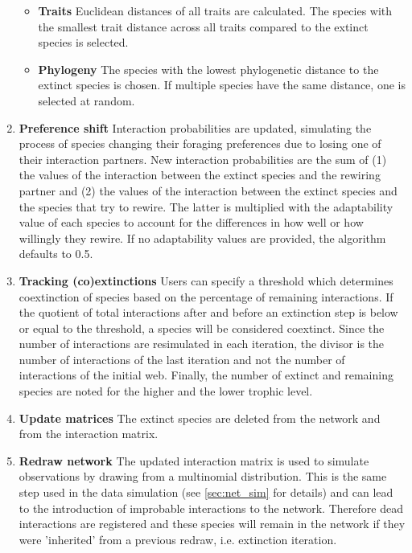 \documentclass[12pt,a4paper]{article}
\begin{document}
\begin{enumerate}
\begin{itemize}
		\item \label{itm:trait_rew} \textbf{Traits} {\small Euclidean distances of all traits are calculated. The species with the smallest trait distance across all traits compared to the extinct species is selected.}
		\item \label{itm:phylo_rew} \textbf{Phylogeny} {\small The species with the lowest phylogenetic distance to the extinct species is chosen. If multiple species have the same distance, one is selected at random.}
		\end{itemize}
	\item \label{itm:shift} \textbf{Preference shift} {\small Interaction probabilities are updated, simulating the process of species changing their foraging preferences due to losing one of their interaction partners. New interaction probabilities are the sum of (1) the values of the interaction between the extinct species and the rewiring partner and (2) the values of the interaction between the extinct species and the species that try to rewire. The latter is multiplied with the adaptability value of each species to account for the differences in how well or how willingly they rewire. If no adaptability values are provided, the algorithm defaults to 0.5.}
	\item  \label{itm:track} \textbf{Tracking (co)extinctions} {\small Users can specify a threshold which determines coextinction of species based on the percentage of remaining interactions. If the quotient of total interactions after and before an extinction step is below or equal to the threshold, a species will be considered coextinct. Since the number of interactions are resimulated in each iteration, the divisor is the number of interactions of the last iteration and not the number of interactions of the initial web. Finally, the number of extinct and remaining species are noted for the higher and the lower trophic level.}
	\item \label{itm:update} \textbf{Update matrices} {\small The extinct species are deleted from the network and from the interaction matrix.}
	\item \label{itm:redraw} \textbf{Redraw network} {\small The updated interaction matrix is used to simulate observations by drawing from a multinomial distribution. This is the same step used in the data simulation (see \ref{sec:net_sim} for details) and can lead to the introduction of improbable interactions to the network. Therefore dead interactions are registered and these species will remain in the network if they were 'inherited' from a previous redraw, i.e. extinction iteration.}
	\end{enumerate}
\end{document}
